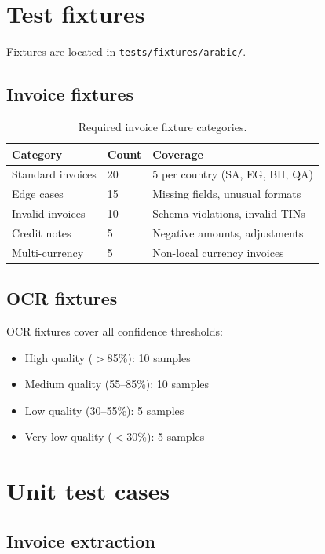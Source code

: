 \documentclass[11pt,a4paper,twoside]{report}
\begin{document}
\section{Test fixtures}

Fixtures are located in \texttt{tests/fixtures/arabic/}.

\subsection{Invoice fixtures}

\begin{table}[htbp]
\centering
\caption{Required invoice fixture categories.}
\footnotesize
\begin{tabularx}{\linewidth}{@{}l l X@{}}
\toprule
\textbf{Category} & \textbf{Count} & \textbf{Coverage} \\ \midrule
Standard invoices & 20 & 5 per country (SA, EG, BH, QA) \\
Edge cases & 15 & Missing fields, unusual formats \\
Invalid invoices & 10 & Schema violations, invalid TINs \\
Credit notes & 5 & Negative amounts, adjustments \\
Multi-currency & 5 & Non-local currency invoices \\
\bottomrule
\end{tabularx}
\end{table}

\subsection{OCR fixtures}

OCR fixtures cover all confidence thresholds:
\begin{itemize}
  \item High quality ($>$85\%): 10 samples
  \item Medium quality (55--85\%): 10 samples
  \item Low quality (30--55\%): 5 samples
  \item Very low quality ($<$30\%): 5 samples
\end{itemize}

\section{Unit test cases}

\subsection{Invoice extraction}
\end{document}

